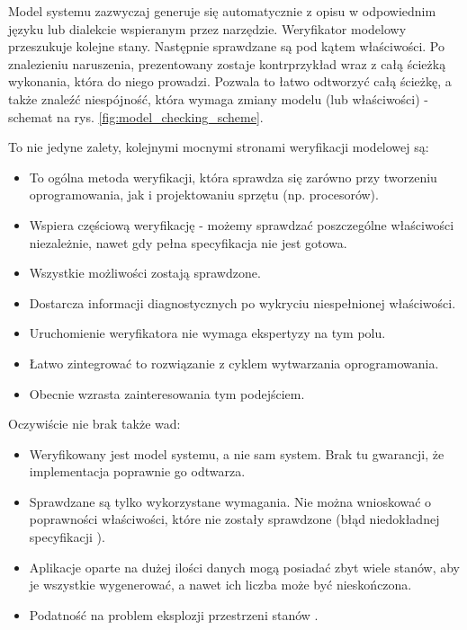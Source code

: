 \vspace{0.5cm}
Model systemu zazwyczaj generuje się automatycznie z opisu w odpowiednim języku lub dialekcie wspieranym przez narzędzie. 
Weryfikator modelowy przeszukuje kolejne stany. Następnie sprawdzane są pod kątem właściwości. Po znalezieniu naruszenia, prezentowany zostaje kontrprzykład wraz z całą ścieżką wykonania, która do niego prowadzi. Pozwala to łatwo odtworzyć całą ścieżkę, a także znaleźć niespójność, która wymaga zmiany modelu (lub właściwości) - schemat na rys. \ref{fig:model_checking_scheme}.

\vspace{0.5cm}
\noindent
To nie jedyne zalety, kolejnymi mocnymi stronami weryfikacji modelowej są:
\begin{itemize}
\item To ogólna metoda weryfikacji, która sprawdza się zarówno przy tworzeniu oprogramowania, jak i projektowaniu sprzętu (np. procesorów).
\item Wspiera częściową weryfikację - możemy sprawdzać poszczególne właściwości niezależnie, nawet gdy pełna specyfikacja nie jest gotowa.
\item Wszystkie możliwości zostają sprawdzone.
\item Dostarcza informacji diagnostycznych po wykryciu niespełnionej właściwości.
\item Uruchomienie weryfikatora nie wymaga ekspertyzy na tym polu.
\item Łatwo zintegrować to rozwiązanie z cyklem wytwarzania oprogramowania.
\item Obecnie wzrasta zainteresowania tym podejściem.
\end{itemize}

\vspace{0.5cm}
\noindent
Oczywiście nie brak także wad:
\begin{itemize}
\item Weryfikowany jest model systemu, a nie sam system. Brak tu gwarancji, że implementacja poprawnie go odtwarza.
\item Sprawdzane są tylko wykorzystane wymagania. Nie można wnioskować o poprawności właściwości, które nie zostały sprawdzone (błąd niedokładnej specyfikacji \cite{Lam05}).
\item Aplikacje oparte na dużej ilości danych mogą posiadać zbyt wiele stanów, aby je wszystkie wygenerować, a nawet ich liczba może być nieskończona.
\item Podatność na problem eksplozji przestrzeni stanów \cite{Cla11}.
\end{itemize}


